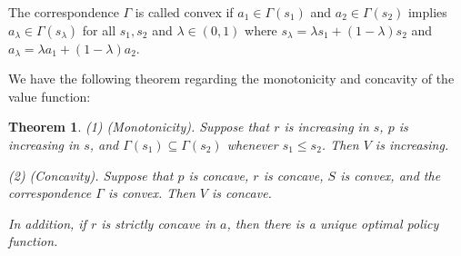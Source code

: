 \documentclass[letter,11pt]{article}
\newtheorem{theorem}{Theorem}[section]
\begin{document}
 The correspondence $\Gamma$ is called convex if  $a_{1} \in \Gamma (s_{1})$ and $a_{2} \in \Gamma (s_{2})$ implies $a_{\lambda} \in \Gamma (s_{\lambda})$ for all $s_{1},s_{2}$ and $\lambda \in (0,1)$ where   
 $s_{\lambda} = \lambda s_{1} +(1-\lambda) s_{2}$ and $a_{\lambda} = \lambda a_{1} +(1-\lambda) a_{2}$.


 
 We have the following theorem regarding the monotonicity and concavity of the value function:

 \begin{theorem} \label{Thm:value_prop}
       (1) (Monotonicity). Suppose that $r$ is increasing in $s$, $p$ is increasing in $s$, and $\Gamma(s_{1}) \subseteq \Gamma(s_{2})$ whenever $s_{1} \leq s_{2}$. Then $V$ is increasing.  

     (2) (Concavity). Suppose that $p$ is concave, $r$ is concave, $S$ is convex, and the correspondence $\Gamma$ is convex. Then $V$ is concave.
     
     In addition, if $r$ is strictly concave in $a$, then there is a unique optimal policy function. 
 \end{theorem}
\end{document}
